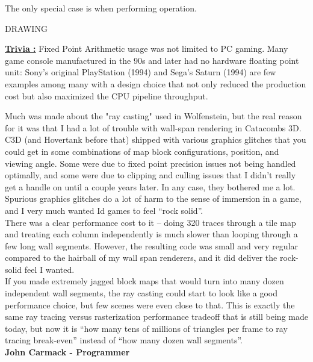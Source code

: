\documentclass[book.tex]{subfiles}
\begin{document}
 The only special case is when performing operation.

\bigskip
  DRAWING
  \bigskip



 \textbf{\underline{Trivia :}}  Fixed Point Arithmetic usage was not limited to PC gaming. Many game console manufactured in the 90s and later had no hardware floating point unit: Sony's original PlayStation (1994) and Sega's Saturn (1994) are few examples among many with a design choice that not only reduced the production cost but also maximized the CPU pipeline throughput.
 
 
 
\begin{fancyquotes}
Much was made about the "ray casting" used in Wolfenstein, but the real reason for it was that I had a lot of trouble with wall-span rendering in Catacombs 3D.  C3D (and Hovertank before that) shipped with various graphics glitches that you could get in some combinations of map block configurations, position, and viewing angle.  Some were due to fixed point precision issues not being handled optimally, and some were due to clipping and culling issues that I didn’t really get a handle on until a couple years later.  In any case, they bothered me a lot.  Spurious graphics glitches do a lot of harm to the sense of immersion in a game, and I very much wanted Id games to feel “rock solid”.
 \bigskip \\
There was a clear performance cost to it – doing 320 traces through a tile map and treating each column independently is much slower than looping through a few long wall segments.  However, the resulting code was small and very regular compared to the hairball of my wall span renderers, and it did deliver the rock-solid feel I wanted.
 \bigskip \\
If you made extremely jagged block maps that would turn into many dozen independent wall segments, the ray casting could start to look like a good performance choice, but few scenes were even close to that.  This is exactly the same ray tracing versus rasterization performance tradeoff that is still being made today, but now it is “how many tens of millions of triangles per frame to ray tracing break-even” instead of “how many dozen wall segments”.
 \bigskip \\
\textbf{John Carmack - Programmer}
 \end{fancyquotes}
 
\end{document}
